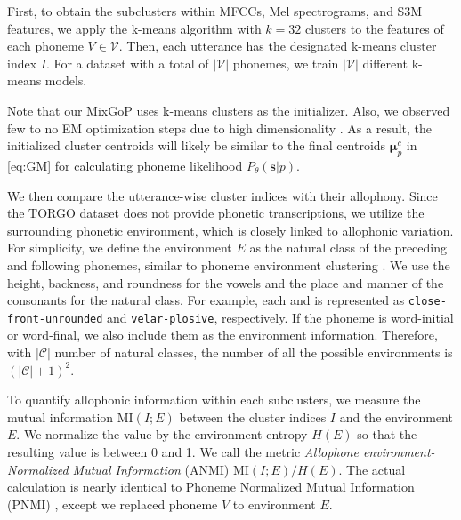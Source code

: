 

First, to obtain the subclusters within MFCCs, Mel spectrograms, and S3M features, we apply the k-means algorithm with $k=32$ clusters to the features of each phoneme $V \in \mathcal{V}$.
Then, each utterance has the designated k-means cluster index $I$.
For a dataset with a total of $|\mathcal{V}|$ phonemes, we train $|\mathcal{V}|$ different k-means models.


Note that our MixGoP uses k-means clusters as the initializer.
Also, we observed few to no EM optimization steps due to high dimensionality \citep{wang2015high}.
As a result, the initialized cluster centroids will likely be similar to the final centroids $\pmb{\mu}_p^c$ in \cref{eq:GM} for calculating phoneme likelihood $P_\theta(\mathbf{s}|p)$.


We then compare the utterance-wise cluster indices with their allophony.
Since the TORGO dataset does not provide phonetic transcriptions, we utilize the surrounding phonetic environment, which is closely linked to allophonic variation.
For simplicity, we define the environment $E$ as the natural class of the preceding and following phonemes, similar to phoneme environment clustering \citep{sagayama1989phoneme}.
We use the height, backness, and roundness for the vowels and the place and manner of the consonants for the natural class.
For example, each  and  is represented as \texttt{close-front-unrounded} and \texttt{velar-plosive}, respectively.
If the phoneme is word-initial or word-final, we also include them as the environment information.
Therefore, with $|\mathcal{C}|$ number of natural classes, the number of all the possible environments is $(|\mathcal{C}| + 1)^2$.



To quantify allophonic information within each subclusters, we measure the mutual information $\text{MI}(I; E)$ between the cluster indices $I$ and the environment $E$.
We normalize the value by the environment entropy $H(E)$ so that the resulting value is between 0 and 1.
We call the metric \textit{Allophone environment-Normalized Mutual Information} (ANMI) $\text{MI}(I; E) / H(E)$.
The actual calculation is nearly identical to Phoneme Normalized Mutual Information (PNMI) \citep{hsu2021hubert}, except we replaced phoneme $V$ to environment $E$.



